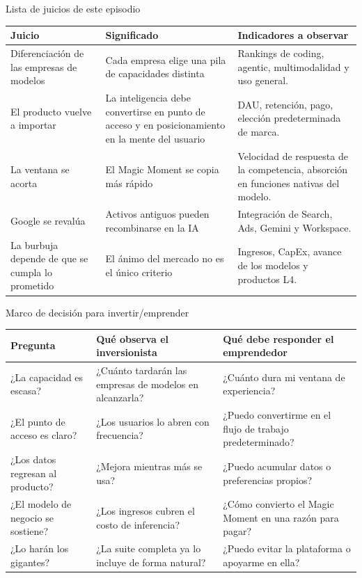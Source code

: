 \begin{knowledgebox}{Lista de juicios de este episodio}
\begin{tabularx}{\textwidth}{p{}p{}X}
\toprule
Juicio & Significado & Indicadores a observar \\
\midrule
Diferenciación de las empresas de modelos & Cada empresa elige una pila de capacidades distinta & Rankings de coding, agentic, multimodalidad y uso general. \\
El producto vuelve a importar & La inteligencia debe convertirse en punto de acceso y en posicionamiento en la mente del usuario & DAU, retención, pago, elección predeterminada de marca. \\
La ventana se acorta & El Magic Moment se copia más rápido & Velocidad de respuesta de la competencia, absorción en funciones nativas del modelo. \\
Google se revalúa & Activos antiguos pueden recombinarse en la IA & Integración de Search, Ads, Gemini y Workspace. \\
La burbuja depende de que se cumpla lo prometido & El ánimo del mercado no es el único criterio & Ingresos, CapEx, avance de los modelos y productos L4. \\
\bottomrule
\end{tabularx}
\end{knowledgebox}

\begin{knowledgebox}{Marco de decisión para invertir/emprender}
\begin{tabularx}{\textwidth}{p{}p{}X}
\toprule
Pregunta & Qué observa el inversionista & Qué debe responder el emprendedor \\
\midrule
¿La capacidad es escasa? & ¿Cuánto tardarán las empresas de modelos en alcanzarla? & ¿Cuánto dura mi ventana de experiencia? \\
¿El punto de acceso es claro? & ¿Los usuarios lo abren con frecuencia? & ¿Puedo convertirme en el flujo de trabajo predeterminado? \\
¿Los datos regresan al producto? & ¿Mejora mientras más se usa? & ¿Puedo acumular datos o preferencias propios? \\
¿El modelo de negocio se sostiene? & ¿Los ingresos cubren el costo de inferencia? & ¿Cómo convierto el Magic Moment en una razón para pagar? \\
¿Lo harán los gigantes? & ¿La suite completa ya lo incluye de forma natural? & ¿Puedo evitar la plataforma o apoyarme en ella? \\
\bottomrule
\end{tabularx}
\end{knowledgebox}

